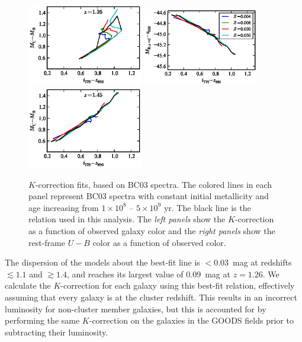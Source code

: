 \begin{figure}[p]
\begin{center}
\includegraphics[width=0.45\textwidth]{figures/clrate/kcorr_color_z3.eps}
\includegraphics[width=0.45\textwidth]{figures/clrate/kcorr_mag_z4.eps}%
\includegraphics[width=0.45\textwidth]{figures/clrate/kcorr_color_z4.eps}
\end{center}
\caption[$K$-correction fits to Bruzual \& Charlot (2003)
spectra]{$K$-correction fits, based on BC03 spectra.  The colored
lines in each panel represent BC03 spectra with constant initial
metallicity and age increasing from $1 \times 10^8$ -- $5 \times 10^9$
yr. The black line is the relation used in this analysis. The \emph{left
panels} show the $K$-correction as a function of observed galaxy color
and the \emph{right panels} show the rest-frame $U-B$ color as a function of
observed color. \label{fig:kcorr}}
\end{figure}

The dispersion of the models about the best-fit line is $<0.03$~mag at
redshifts $\lesssim 1.1$ and $\gtrsim 1.4$, and reaches its largest
value of 0.09~mag at $z=1.26$. We calculate the $K$-correction for
each galaxy using this best-fit relation, effectively assuming that
every galaxy is at the cluster redshift. This results in an incorrect
luminosity for non-cluster member galaxies, but this is accounted for
by performing the same $K$-correction on the galaxies in the GOODS
fields prior to subtracting their luminosity. 


